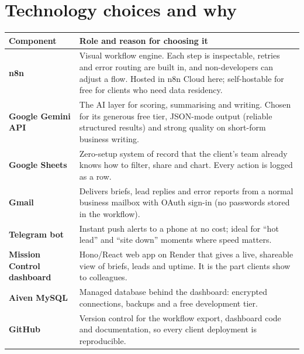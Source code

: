 \documentclass[11pt,a4paper]{article}
\begin{document}
\section{Technology choices and why}
\begin{tabularx}{\linewidth}{@{}p{3.1cm}X@{}}
\toprule
\textbf{Component} & \textbf{Role and reason for choosing it}\\
\midrule
\textbf{n8n} & Visual workflow engine. Each step is inspectable, retries and error routing are built in, and non-developers can adjust a flow. Hosted in n8n Cloud here; self-hostable for free for clients who need data residency.\\
\addlinespace
\textbf{Google Gemini API} & The AI layer for scoring, summarising and writing. Chosen for its generous free tier, JSON-mode output (reliable structured results) and strong quality on short-form business writing.\\
\addlinespace
\textbf{Google Sheets} & Zero-setup system of record that the client's team already knows how to filter, share and chart. Every action is logged as a row.\\
\addlinespace
\textbf{Gmail} & Delivers briefs, lead replies and error reports from a normal business mailbox with OAuth sign-in (no passwords stored in the workflow).\\
\addlinespace
\textbf{Telegram bot} & Instant push alerts to a phone at no cost; ideal for ``hot lead'' and ``site down'' moments where speed matters.\\
\addlinespace
\textbf{Mission Control dashboard} & Hono/React web app on Render that gives a live, shareable view of briefs, leads and uptime. It is the part clients show to colleagues.\\
\addlinespace
\textbf{Aiven MySQL} & Managed database behind the dashboard: encrypted connections, backups and a free development tier.\\
\addlinespace
\textbf{GitHub} & Version control for the workflow export, dashboard code and documentation, so every client deployment is reproducible.\\
\bottomrule
\end{tabularx}

\end{document}
